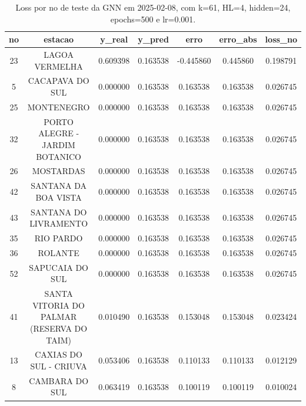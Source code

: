 \begin{table}[h]
\centering
\caption{Loss por no de teste da GNN em 2025-02-08, com k=61, HL=4, hidden=24, epochs=500 e lr=0.001.}
\label{tab:gnn_loss_k61_hl4_h24_e500_d20250208}
\begin{tabular}{ccccccc}
\toprule
no & estacao & y\_real & y\_pred & erro & erro\_abs & loss\_no \\
\midrule
23 & LAGOA VERMELHA & 0.609398 & 0.163538 & -0.445860 & 0.445860 & 0.198791 \\
5 & CACAPAVA DO SUL & 0.000000 & 0.163538 & 0.163538 & 0.163538 & 0.026745 \\
25 & MONTENEGRO & 0.000000 & 0.163538 & 0.163538 & 0.163538 & 0.026745 \\
32 & PORTO ALEGRE - JARDIM BOTANICO & 0.000000 & 0.163538 & 0.163538 & 0.163538 & 0.026745 \\
26 & MOSTARDAS & 0.000000 & 0.163538 & 0.163538 & 0.163538 & 0.026745 \\
42 & SANTANA DA BOA VISTA & 0.000000 & 0.163538 & 0.163538 & 0.163538 & 0.026745 \\
43 & SANTANA DO LIVRAMENTO & 0.000000 & 0.163538 & 0.163538 & 0.163538 & 0.026745 \\
35 & RIO PARDO & 0.000000 & 0.163538 & 0.163538 & 0.163538 & 0.026745 \\
36 & ROLANTE & 0.000000 & 0.163538 & 0.163538 & 0.163538 & 0.026745 \\
52 & SAPUCAIA DO SUL & 0.000000 & 0.163538 & 0.163538 & 0.163538 & 0.026745 \\
41 & SANTA VITORIA DO PALMAR (RESERVA DO TAIM) & 0.010490 & 0.163538 & 0.153048 & 0.153048 & 0.023424 \\
13 & CAXIAS DO SUL - CRIUVA & 0.053406 & 0.163538 & 0.110133 & 0.110133 & 0.012129 \\
8 & CAMBARA DO SUL & 0.063419 & 0.163538 & 0.100119 & 0.100119 & 0.010024 \\
\bottomrule
\end{tabular}
\end{table}

